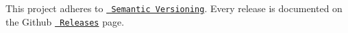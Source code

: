 This project adheres to \href{http://semver.org/}{\texttt{ Semantic Versioning}}. Every release is documented on the Github \href{https://github.com/tfussell/xlnt/releases}{\texttt{ Releases}} page. 